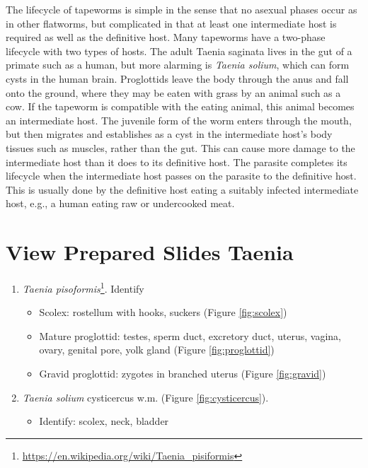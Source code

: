 \documentclass[]{book}
\providecommand{\tightlist}{%
  \setlength{\itemsep}{0pt}\setlength{\parskip}{0pt}}
\let\rmarkdownfootnote\footnote%
\def\footnote{\protect\rmarkdownfootnote}
\renewcommand{\href}[2]{#2\footnote{\url{#1}}}
\begin{document}
The lifecycle of tapeworms is simple in the sense that no asexual phases occur as in other flatworms, but complicated in that at least one intermediate host is required as well as the definitive host. Many tapeworms have a two-phase lifecycle with two types of hosts. The adult Taenia saginata lives in the gut of a primate such as a human, but more alarming is \emph{Taenia solium}, which can form cysts in the human brain. Proglottids leave the body through the anus and fall onto the ground, where they may be eaten with grass by an animal such as a cow. If the tapeworm is compatible with the eating animal, this animal becomes an intermediate host. The juvenile form of the worm enters through the mouth, but then migrates and establishes as a cyst in the intermediate host's body tissues such as muscles, rather than the gut. This can cause more damage to the intermediate host than it does to its definitive host. The parasite completes its lifecycle when the intermediate host passes on the parasite to the definitive host. This is usually done by the definitive host eating a suitably infected intermediate host, e.g., a human eating raw or undercooked meat.

\hypertarget{view-prepared-slides-taenia}{%
\section{View Prepared Slides Taenia}\label{view-prepared-slides-taenia}}

\begin{enumerate}
\def\labelenumi{\arabic{enumi}.}
\tightlist
\item
  \href{https://en.wikipedia.org/wiki/Taenia_pisiformis}{\emph{Taenia pisoformis}}. Identify

  \begin{itemize}
  \tightlist
  \item
    Scolex: rostellum with hooks, suckers (Figure \ref{fig:scolex})
  \item
    Mature proglottid: testes, sperm duct, excretory duct, uterus, vagina, ovary, genital pore, yolk gland (Figure \ref{fig:proglottid})
  \item
    Gravid proglottid: zygotes in branched uterus (Figure \ref{fig:gravid})
  \end{itemize}
\item
  \emph{Taenia solium} cysticercus w.m. (Figure \ref{fig:cysticercus}).

  \begin{itemize}
  \tightlist
  \item
    Identify: scolex, neck, bladder
  \end{itemize}
\end{enumerate}
\end{document}
